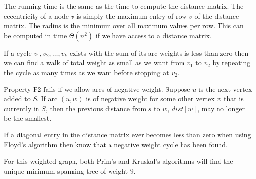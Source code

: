 The running time is the same as the time to compute the distance matrix.
The eccentricity of a node $v$ is simply the maximum
entry of row $v$ of the distance matrix.  The radius is the
minimum over all maximum values per row.  This can be computed in time $\Theta(n^2)$
if we have access to a distance matrix.

If a cycle $v_1,v_2,\ldots,v_k$ exists with the sum of its arc weights is less than zero 
then we can find a walk of total weight as small as we want from $v_1$ to $v_2$ by repeating
the cycle as many times as we want before stopping at $v_2$.

Property P2 fails if we allow arcs of negative weight.  Suppose $u$ is the next
vertex added to $S$.  If arc $(u,w)$ is of negative weight for some other vertex $w$
that is currently in $S$, then the previous distance from $s$ to $w$, $dist[w]$, may no 
longer be the smallest.

{}
If a diagonal entry in the distance matrix ever becomes less than zero when
using Floyd's algorithm then know that a negative weight cycle has been found.

For this weighted graph, both Prim's and Kruskal's algorithms will find the 
unique minimum spanning tree of weight $9$.


